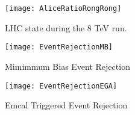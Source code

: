 \begin{figure}[h]
\texttt{[image: AliceRatioRongRong]}
\centering
\caption{LHC state during the 8 TeV run. }
\label{fig:RunEff}
\end{figure}

\begin{figure}[!tbp]
  \centering
  \begin{minipage}[b]{0.49\textwidth}
    \texttt{[image: EventRejectionMB]}
    \caption{Mimimmum Bias Event Rejection}
  \end{minipage}
  \hfill
  \begin{minipage}[b]{0.49\textwidth}
    \texttt{[image: EventRejectionEGA]}
    \caption{Emcal Triggered Event Rejection}
  \end{minipage}
\end{figure}